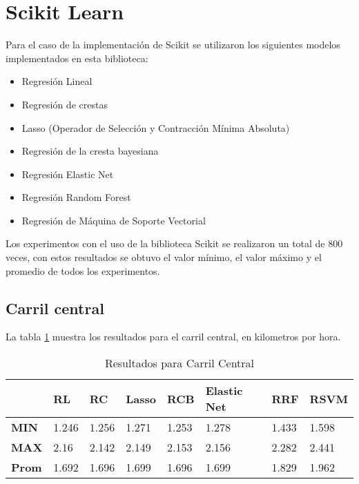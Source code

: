 \section{Scikit Learn}

Para el caso de la implementación de Scikit se utilizaron los siguientes modelos implementados en esta biblioteca:

\begin{itemize}
    \item Regresión Lineal
    \item Regresión de crestas
    \item Lasso (Operador de Selección y Contracción Mínima Absoluta)
    \item Regresión de la cresta bayesiana
    \item Regresión Elastic Net
    \item Regresión Random Forest
    \item Regresión de Máquina de Soporte Vectorial
\end{itemize}

Los experimentos con el uso de la biblioteca Scikit se realizaron un total de 800 veces, con estos resultados se obtuvo el valor mínimo, el valor máximo y el promedio de todos los experimentos.

\subsection{Carril central}

La tabla \ref{tab:resultadosScikitCarrilCentral} muestra los resultados para el carril central, en kilometros por hora.


\begin{table}[H]
    \centering
    \caption{Resultados para Carril Central}
    \label{tab:resultadosScikitCarrilCentral}
    \begin{tabular}{|l|l|l|l|l|l|l|l|} \hline
        & \textbf{RL} & \textbf{RC} & \textbf{Lasso} & \textbf{RCB} & \textbf{Elastic Net} & \textbf{RRF} & \textbf{RSVM} \\ \hline

        \textbf{MIN} & 1.246 & 1.256 & 1.271 & 1.253 & 1.278                & 1.433 & 1.598 \\ \hline
        \textbf{MAX} & 2.16 & 2.142 & 2.149 & 2.153 & 2.156                & 2.282 & 2.441 \\ \hline
        \textbf{Prom} & 1.692 & 1.696 & 1.699 & 1.696 & 1.699 & 1.829 & 1.962 \\ \hline
    \end{tabular}
\end{table}



